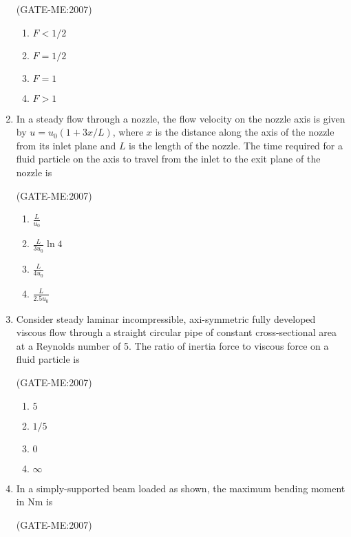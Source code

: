 \documentclass[journal,12pt,onecolumn]{IEEEtran}
\theoremstyle{remark}
\begin{document}
\begin{enumerate}
	  \hfill{(GATE-ME:2007)}
	  \begin{multicols}{2}
\begin{enumerate}
    \item $F < 1/2$
    \item $F = 1/2$
    \item $F = 1$
    \item $F > 1$
\end{enumerate}
\end{multicols}

\item In a steady flow through a nozzle, the flow velocity on the nozzle axis is given by $u = u_0(1 + 3x/L)$, where $x$ is the distance along the axis of the nozzle from its inlet plane and $L$ is the length of the nozzle. The time required for a fluid particle on the axis to travel from the inlet to the exit plane of the nozzle is

           \hfill{(GATE-ME:2007)}
	   \begin{multicols}{2}
\begin{enumerate}
    \item $\frac{L}{u_0}$
    \item $\frac{L}{3 u_0} \ln 4$
    \item $\frac{L}{4 u_0}$
    \item $\frac{L}{2.5 u_0}$
\end{enumerate}
\end{multicols}

\item Consider steady laminar incompressible, axi-symmetric fully developed viscous flow through a straight circular pipe of constant cross-sectional area at a Reynolds number of 5. The ratio of inertia force to viscous force on a fluid particle is

	\hfill{(GATE-ME:2007)}
\begin{multicols}{2}
\begin{enumerate}
    \item $5$
    \item $1/5$
    \item $0$
    \item $\infty$
\end{enumerate}
\end{multicols}

\item In a simply-supported beam loaded as shown, the maximum bending moment in Nm is 

	\hfill{(GATE-ME:2007)}


\end{enumerate}
\end{document}

